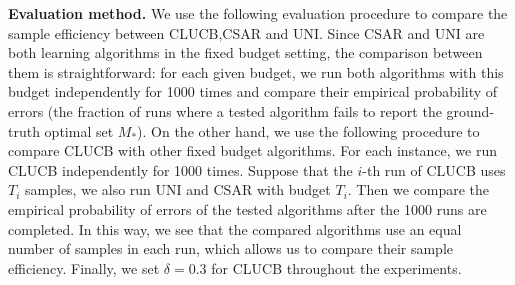 \documentclass{article}
\newcommand{\Algorithm}{{\small \textsf{CLUCB}}\xspace}
\newcommand{\AlgorithmBud}{{\small \textsf{CSAR}}\xspace}
\newcommand{\Uniform}{{\small \textsf{UNI}}\xspace}
\begin{document}
\textbf{Evaluation method.} 
We use the following evaluation procedure to compare the sample efficiency between \Algorithm,\AlgorithmBud and \Uniform.
Since \AlgorithmBud and \Uniform are both learning algorithms in the fixed budget setting, the comparison between them is straightforward:
for each given budget, we run both algorithms with this budget independently for 1000 times and compare their empirical probability of errors (the fraction of runs where a tested algorithm fails to report the ground-truth optimal set $M_*$).
On the other hand, we use the following procedure to compare \Algorithm with other fixed budget algorithms.
For each instance, we run \Algorithm independently for 1000 times.
Suppose that the $i$-th run of \Algorithm uses $T_i$ samples, we also run \Uniform and \AlgorithmBud with budget $T_i$.
Then we compare the empirical probability of errors of the tested algorithms after the 1000 runs are completed.
In this way, we see that the compared algorithms use an equal number of samples in each run, which allows us to compare their sample efficiency.
Finally, we set $\delta=0.3$ for \Algorithm throughout the experiments.
\end{document}

